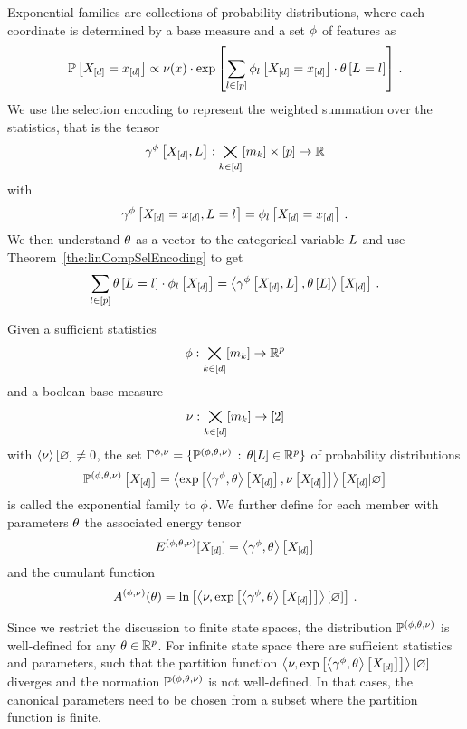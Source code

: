 \label{sec:exponentialFamilies}

Exponential families are collections of probability distributions, where each coordinate is determined by a base measure and a set $\phi$ of features as
	\[ \mathbb{P}\left[X_{[d]}=x_{[d]}\right]  \propto \nu(x) \cdot \mathrm{exp}\left[\sum_{l\in[p]} \phi_{l}\left[X_{[d]}=x_{[d]}\right] \cdot \theta\left[L_{}=l_{}\right]\right] \, . \]
We use the selection encoding to represent the weighted summation over the statistics, that is the tensor
	\[ \gamma^{\phi}\left[X_{[d]},L\right]: \bigtimes_{k\in[d]}[m_{k}] \times [p] \rightarrow \mathbb{R} \]
with
	\[ \gamma^{\phi}\left[X_{[d]}=x_{[d]},L_{}=l_{}\right] = \phi_{l}\left[X_{[d]}=x_{[d]}\right] \, . \]
We then understand $\theta$ as a vector to the categorical variable $L$ and use Theorem~\ref{the:linCompSelEncoding} to get
	\[ \sum_{l\in[p]}\theta\left[L_{}=l_{}\right]\cdot \phi_{l}\left[X_{[d]}\right]
		 = \left\langle \gamma^{\phi}\left[X_{[d]},L\right],\theta\left[L\right]\right\rangle \left[ X_{[d]} \right] \, . \]

\begin{definition}\label{def:expFamily}
	Given a sufficient statistics 
		\[ \phi : \bigtimes_{k\in[d]}[m_{k}] \rightarrow \mathbb{R}^{p}\]
	and a boolean base measure
		\[ \nu : \bigtimes_{k\in[d]}[m_{k}] \rightarrow [2] \]
	with $\left\langle \nu\right\rangle \left[ \varnothing \right]\neq0$,  the set $\Gamma^{\phi,\nu}=\{\mathbb{P}^{(\phi,\theta,\nu)} \, : \, \theta[L] \in \mathbb{R}^{p}\}$ of probability distributions 
		\[ \mathbb{P}^{(\phi,\theta,\nu)}\left[X_{[d]}\right] = \left\langle \mathrm{exp}\left[\left\langle \gamma^{\phi},\theta\right\rangle \left[ X_{[d]} \right],\nu\left[X_{[d]}\right]\right]\right\rangle \left[ X_{[d]} | \varnothing \right] \]
	is called the exponential family to $\phi$.
	We further define for each member with parameters $\theta$ the associated energy tensor
		\[ E^{(\phi,\theta,\nu)}[X_{[d]}] = \left\langle \gamma^{\phi},\theta\right\rangle \left[ X_{[d]} \right] \]
	and the cumulant function
		\[ A^{(\phi,\nu)}(\theta) = \ln \left[ \left\langle \nu,\mathrm{exp}\left[\left\langle \gamma^{\phi},\theta\right\rangle \left[ X_{[d]} \right] \right]\right\rangle \left[ \varnothing \right]  \right] \, .\]
\end{definition}



Since we restrict the discussion to finite state spaces, the distribution $\mathbb{P}^{(\phi,\theta,\nu)}$ is well-defined for any $\theta\in\mathbb{R}^{p}$.
For infinite state space there are sufficient statistics and parameters, such that the partition function $\left\langle \nu,\mathrm{exp}\left[\left\langle \gamma^{\phi},\theta\right\rangle \left[ X_{[d]} \right]\right]\right\rangle \left[ \varnothing \right]$ diverges and the normation $\mathbb{P}^{(\phi,\theta,\nu)}$ is not well-defined.
In that cases, the canonical parameters need to be chosen from a subset where the partition function is finite. 

